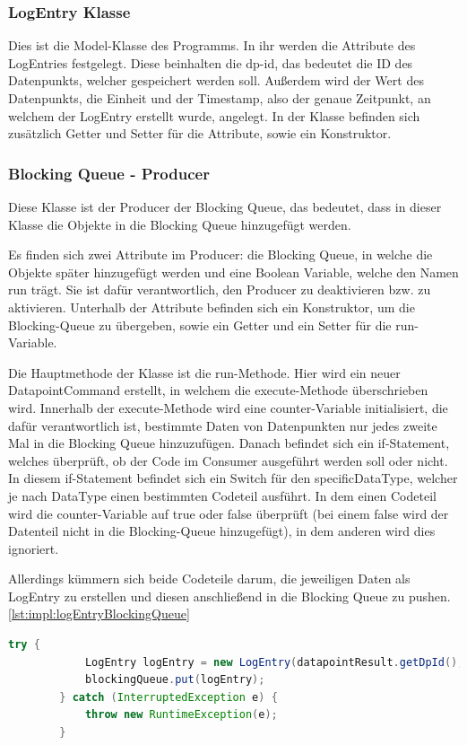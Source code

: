 \subsubsection{LogEntry Klasse}
Dies ist die Model-Klasse des Programms. In ihr werden die Attribute des LogEntries festgelegt. Diese beinhalten die dp-id, das bedeutet die ID des Datenpunkts, welcher gespeichert werden soll. Außerdem wird der Wert des Datenpunkts, die Einheit und der Timestamp, also der genaue Zeitpunkt, an welchem der LogEntry erstellt wurde, angelegt. In der Klasse befinden sich zusätzlich Getter und Setter für die Attribute, sowie ein Konstruktor.
 
\subsubsection{Blocking Queue - Producer }
Diese Klasse ist der Producer der Blocking Queue, das bedeutet, dass in dieser Klasse die Objekte in die Blocking Queue hinzugefügt werden.
 
Es finden sich zwei Attribute im Producer: die Blocking Queue, in welche die Objekte später hinzugefügt werden und eine Boolean Variable, welche den Namen \glqq run\grqq{} trägt. Sie ist dafür verantwortlich, den Producer zu deaktivieren bzw. zu aktivieren. Unterhalb der Attribute befinden sich ein Konstruktor, um die Blocking-Queue zu übergeben, sowie ein Getter und ein Setter für die run-Variable.

Die Hauptmethode der Klasse ist die run-Methode. Hier wird ein neuer DatapointCommand erstellt, in welchem die execute-Methode überschrieben wird. Innerhalb der execute-Methode wird eine counter-Variable initialisiert, die dafür verantwortlich ist, bestimmte Daten von Datenpunkten nur jedes zweite Mal in die Blocking Queue hinzuzufügen. Danach befindet sich ein if-Statement, welches überprüft, ob der Code im Consumer ausgeführt werden soll oder nicht. In diesem if-Statement befindet sich ein Switch für den specificDataType, welcher je nach DataType einen bestimmten Codeteil ausführt. In dem einen Codeteil wird die counter-Variable auf true oder false überprüft (bei einem false wird der Datenteil nicht in die Blocking-Queue hinzugefügt), in dem anderen wird dies ignoriert.
 
Allerdings kümmern sich beide Codeteile darum, die jeweiligen Daten als LogEntry zu erstellen und diesen anschließend in die Blocking Queue zu pushen. \ref{lst:impl:logEntryBlockingQueue}

\begin{lstlisting}[language=java,caption=LogEntry in BlockingQueue hinzufügen,label=lst:impl:logEntryBlockingQueue]
    try {
            LogEntry logEntry = new LogEntry(datapointResult.getDpId(), datapointResult.getValue(), "A", datapointResult.getTimestamp());
            blockingQueue.put(logEntry);
        } catch (InterruptedException e) {
            throw new RuntimeException(e);
        }
\end{lstlisting}

